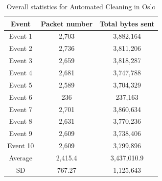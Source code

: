 \begin{table}[H]
\centering
\caption{Overall statistics for Automated Cleaning in Oslo}
\label{tab:ACoverallOSL}
\begin{tabular}{|c|c|c|}
\hline
\textbf{Event} & \textbf{Packet number} & \textbf{Total bytes sent} \\ \hline
Event 1        & 2,703                   & 3,882,164                   \\ \hline
Event 2        & 2,736                   & 3,811,206                   \\ \hline
Event 3        & 2,659                   & 3,818,287                   \\ \hline
Event 4        & 2,681                   & 3,747,788                   \\ \hline
Event 5        & 2,589                   & 3,704,329                   \\ \hline
Event 6        & 236                    & 237,163                    \\ \hline
Event 7        & 2,701                   & 3,860,634                   \\ \hline
Event 8        & 2,631                   & 3,770,236                   \\ \hline
Event 9        & 2,609                   & 3,738,406                   \\ \hline
Event 10       & 2,609                   & 3,799,896                   \\ \hline
Average        & 2,415.4                 & 3,437,010.9                 \\ \hline
SD       & 767.27
       & 1,125,643               \\ \hline
\end{tabular}
\end{table}

